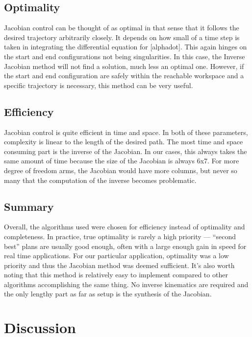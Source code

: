 \documentclass[10pt, conference]{IEEEtran}
\begin{document}
\subsection{Optimality}
\label{sec-5-2}

   Jacobian control can be thought of as optimal in that sense that it
   follows the desired trajectory arbitrarily closely. It depends on
   how small of a time step is taken in integrating the differential
   equation for [alphadot]. This again hinges on the start and end
   configurations not being singularities. In this case, the Inverse
   Jacobian method will not find a solution, much less an optimal
   one. However, if the start and end configuration are safely within
   the reachable workspace and a specific trajectory is necessary, this
   method can be very useful.
\subsection{Efficiency}
\label{sec-5-3}


   Jacobian control is quite efficient in time and space. In both of
   these parameters, complexity is linear to the length of the desired
   path. The most time and space consuming part is the inverse of the
   Jacobian. In our cases, this always takes the same amount of time
   because the size of the Jacobian is always 6x7. For more degree of
   freedom arms, the Jacobian would have more columns, but never so
   many that the computation of the inverse becomes problematic.
\subsection{Summary}
\label{sec-5-4}


   Overall, the algorithms used were chosen for efficiency instead of
   optimality and completeness. In practice, true optimality is rarely
   a high priority — “second best” plans are usually good enough, often
   with a large enough gain in speed for real time applications. For
   our particular application, optimality was a low priority and thus
   the Jacobian method was deemed sufficient. It’s also worth noting
   that this method is relatively easy to implement compared to other
   algorithms accomplishing the same thing. No inverse kinematics are
   required and the only lengthy part as far as setup is the synthesis
   of the Jacobian.
\section{Discussion}
\label{sec-6}
\end{document}

